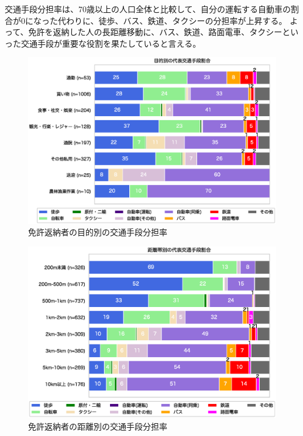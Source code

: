 \documentclass[a4paper,12pt, uplatex]{jsbook}
\begin{document}
\clearpage
交通手段分担率は、70歳以上の人口全体と比較して、自分の運転する自動車の割合が0になった代わりに、徒歩、バス、鉄道、タクシーの分担率が上昇する。
よって、免許を返納した人の長距離移動に、バス、鉄道、路面電車、タクシーといった交通手段が重要な役割を果たしていると言える。
%
\begin{figure}[H]
    \centering
    \includegraphics[width=1.0\textwidth]{picture/mode_share_purpose_返納.eps}
    \caption{免許返納者の目的別の交通手段分担率}
    \label{fig:mode_share_purpose_return}
\end{figure}
%
\begin{figure}[H]
    \centering
    \includegraphics[width=1.0\textwidth]{picture/mode_share_distance_返納.eps}
    \caption{免許返納者の距離別の交通手段分担率}
    \label{fig:mode_share_dist_return}
\end{figure}
\end{document}
